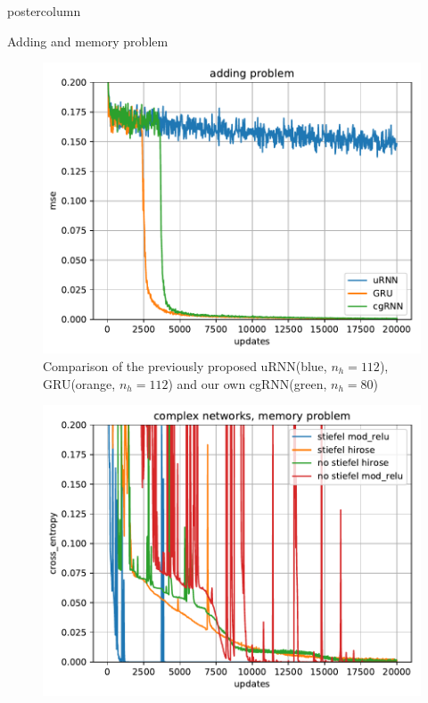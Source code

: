 \documentclass{beamer}
\begin{document}
\begin{frame}
\begin{columns}
\begin{column}{.57\textwidth}
\begin{beamercolorbox}[center]{postercolumn}
\begin{minipage}{.98\textwidth}
{\begin{myblock}{Adding and memory problem}
\begin{figure}
\begin{minipage}{0.45\textwidth}
                                \centering\includegraphics{img/icvss_adding.pdf}
                            \end{minipage}
                            \caption{Comparison of the previously proposed uRNN\cite{Arjovsky}(blue, $n_h=112$), %
                             GRU\cite{cho-al-emnlp14}(orange, $n_h=112$) and our own cgRNN(green, $n_h=80$)} %
                        \end{figure}
                        \vspace{0.25em}
                        \begin{figure}
                            \begin{minipage}{0.43\textwidth}
                                \centering\includegraphics{img/memory_c.pdf}

\end{minipage}
\end{figure}
\end{myblock}}
\end{minipage}
\end{beamercolorbox}
\end{column}
\end{columns}
\end{frame}
\end{document}
